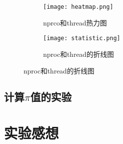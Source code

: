 \documentclass{article}
\begin{document}
\begin{figure}
    \centering
    \begin{subfigure}[b]{0.45\textwidth}
        \centering
        \texttt{[image: heatmap.png]}
        \caption{nprco和thread热力图}
    \end{subfigure}
    \hfill
    \begin{subfigure}[b]{0.45\textwidth}
        \centering
        \texttt{[image: statistic.png]}
        \caption{nproc和thread的折线图}
    \end{subfigure} 
\end{figure}
\subsection{计算$\pi$值的实验}

\subsection{}
\section{实验感想}
\newpage
\appendix
\end{document}
